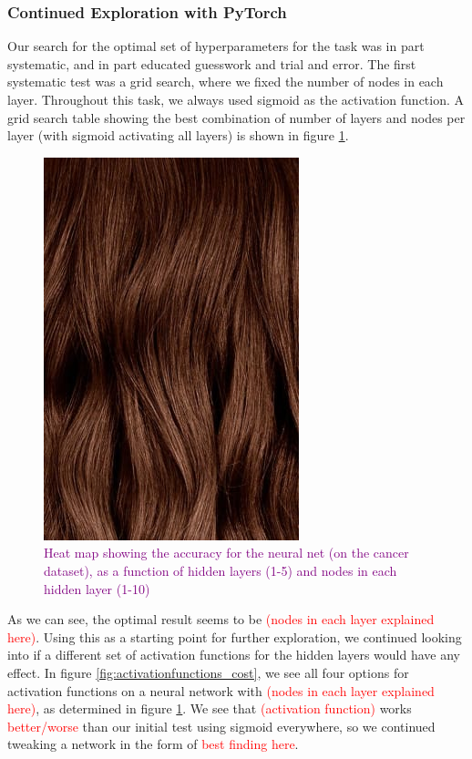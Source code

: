 \subsubsection{Continued Exploration with PyTorch}
Our search for the optimal set of hyperparameters for the task was in part systematic, and in part educated guesswork and trial and error. The first systematic test was a grid search, where we fixed the number of nodes in each layer. Throughout this task, we always used sigmoid as the activation function. A grid search table showing the best combination of number of layers and nodes per layer (with sigmoid activating all layers) is shown in figure \ref{fig:gridsearch_layers_nodes}. 


\begin{figure}
    \centering
    \includegraphics[width=0.5\linewidth]{figures/placeholders/gridsearch_layers_nodes.png}
    \caption{\textcolor{purple}{Heat map showing the accuracy for the neural net (on the cancer dataset), as a function of hidden layers (1-5) and nodes in each hidden layer (1-10)}}
    \label{fig:gridsearch_layers_nodes}
\end{figure}

As we can see, the optimal result seems to be \textcolor{red}{(nodes in each layer explained here)}. Using this as a starting point for further exploration, we continued looking into if a different set of activation functions for the hidden layers would have any effect. In figure \ref{fig:activationfunctions_cost}, we see all four options for activation functions on a neural network with \textcolor{red}{(nodes in each layer explained here)}, as determined in figure \ref{fig:gridsearch_layers_nodes}. We see that \textcolor{red}{(activation function)} works \textcolor{red}{better/worse} than our initial test using sigmoid everywhere, so we continued tweaking a network in the form of \textcolor{red}{best finding here}.

